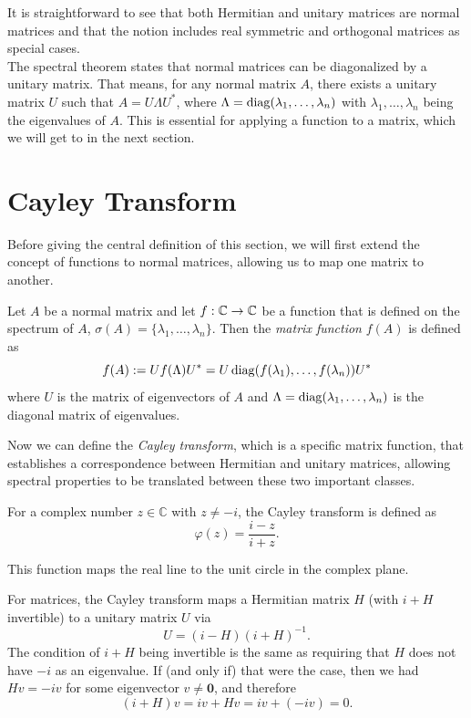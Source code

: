 It is straightforward to see that both Hermitian and unitary matrices are normal matrices
and that the notion includes real symmetric and orthogonal matrices as special cases.\\
The spectral theorem states that normal matrices can be diagonalized by a unitary matrix.
That means, for any normal matrix $A$, there exists a unitary matrix $U$ such that $A = U \Lambda U^*$,
where $\Lambda = \operatorname{diag}(\lambda_1, \ldots, \lambda_n)$ with $\lambda_1, \ldots, \lambda_n$ being the eigenvalues of $A$.
This is essential for applying a function to a matrix, which we will get to in the next section.

\section{Cayley Transform}

Before giving the central definition of this section,
we will first extend the concept of functions to normal matrices,
allowing us to map one matrix to another.

\begin{definition}
    Let $A$ be a normal matrix and let $f: \mathbb{C} \to \mathbb{C}$ be a function that is defined on the spectrum of $A$,
    $\sigma(A) = \{\lambda_1, \ldots, \lambda_n\}$.
    Then the \emph{matrix function} $f(A)$ is defined as
    \[
    f(A) := U f(\Lambda) U^* = U \operatorname{diag}(f(\lambda_1), \ldots, f(\lambda_n)) U^*
    \]
    where $U$ is the matrix of eigenvectors of $A$ and $\Lambda = \operatorname{diag}(\lambda_1, \ldots, \lambda_n)$ is the diagonal matrix of eigenvalues.
\end{definition}

Now we can define the \emph{Cayley transform}, which is a specific matrix function, 
that establishes a correspondence between Hermitian and unitary matrices,
allowing spectral properties to be translated between these two important classes.

For a complex number $z \in \mathbb{C}$ with $z \neq -i$, the Cayley transform is defined as
\[
\varphi(z) = \frac{i - z}{i + z}.
\]

This function maps the real line to the unit circle in the complex plane.

\vspace{0.5cm}



For matrices, the Cayley transform maps a Hermitian matrix $H$ (with $i + H$ invertible) to a unitary matrix $U$ via
\[
U = (i - H)(i + H)^{-1}.
\]
The condition of $i + H$ being invertible is the same as requiring that $H$ does not have $-i$ as an eigenvalue.
If (and only if) that were the case, then we had $H v = -i v$ for some eigenvector $v \neq \mathbf{0}$,
and therefore 
\[
(i + H) v = i v + H v = i v + (-i v) = 0.
\]

